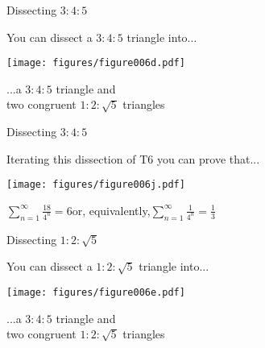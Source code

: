 \documentclass[14pt]{beamer}
\begin{document}

    \begin{frame}{Dissecting $3\!\!:\!\!4\!\!:\!\!5$}
        \begin{center}
            You can dissect a $3\!\!:\!\!4\!\!:\!\!5$ triangle into...

            \bigskip \bigskip

            \texttt{[image: figures/figure006d.pdf]}

            \bigskip \bigskip

            ...a $3\!\!:\!\!4\!\!:\!\!5$ triangle and\\two congruent $1\!\!:\!\!2\!\!:\!\!\sqrt{5}$ triangles
        \end{center}
    \end{frame}


    \begin{frame}{Dissecting $3\!\!:\!\!4\!\!:\!\!5$}
        \begin{center}
            Iterating this dissection of T6 you can prove that...

            \bigskip \bigskip

            \texttt{[image: figures/figure006j.pdf]}

            \bigskip \bigskip

            $\displaystyle\sum_{n=1}^\infty{\tfrac{18}{4^n}} = 6$\qquad or, equivalently,\qquad$\displaystyle\sum_{n=1}^\infty{\tfrac{1}{4^n}} = \tfrac{1}{3}$\\[2ex]
        \end{center}
    \end{frame}


    \begin{frame}{Dissecting $1\!\!:\!\!2\!\!:\!\!\sqrt{5}$}
        \begin{center}
            You can dissect a $1\!\!:\!\!2\!\!:\!\!\sqrt{5}$ triangle into...

            \bigskip \bigskip

            \texttt{[image: figures/figure006e.pdf]}

            \bigskip \bigskip

            ...a $3\!\!:\!\!4\!\!:\!\!5$ triangle and\\two congruent $1\!\!:\!\!2\!\!:\!\!\sqrt{5}$ triangles
        \end{center}
    \end{frame}
\end{document}
